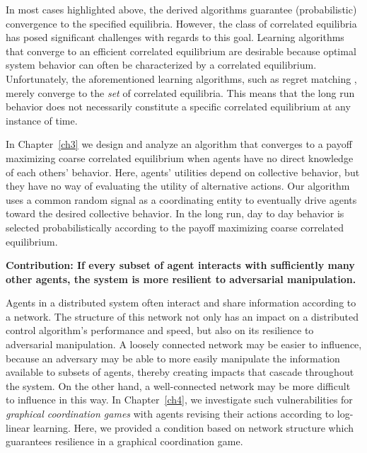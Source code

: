 In most cases highlighted above, the derived algorithms guarantee (probabilistic) convergence to the specified equilibria.  However, the class of correlated equilibria has posed significant challenges with regards to this goal. Learning algorithms that converge to an efficient correlated equilibrium are desirable because optimal system behavior can often be characterized by a correlated equilibrium. Unfortunately, the aforementioned learning algorithms, such as regret matching \cite{Hart2000}, merely converge to the {\it set} of correlated equilibria. This means that the long run behavior does not necessarily constitute a specific correlated equilibrium at any instance of time.


In Chapter~\ref{ch3} we design and analyze an algorithm that converges to a payoff maximizing coarse correlated equilibrium when agents have no direct knowledge of each others' behavior. Here, agents' utilities depend on collective behavior, but they have no way of evaluating the utility of alternative actions. Our algorithm uses a common random signal as a coordinating entity to eventually drive agents toward the desired collective behavior. In the long run, day to day behavior is selected probabilistically according to the payoff maximizing coarse correlated equilibrium.

 

\smallskip

 \noindent\textbf{Contribution: If every subset of agent interacts with sufficiently many other agents, the system is more resilient to adversarial manipulation.}


Agents in a distributed system often interact and share information according to a network. The structure of this network not only has an impact on a distributed control algorithm's performance and speed, but also on its resilience to adversarial manipulation. A loosely connected network may be easier to influence, because an adversary may be able to more easily manipulate the information available to subsets of agents, thereby creating impacts that cascade throughout the system. On the other hand, a well-connected network may be more difficult to influence in this way. In Chapter~\ref{ch4}, we investigate such vulnerabilities for  {\it graphical coordination games} \cite{Ullmann1977,Cooper1999} with agents revising their actions according to log-linear learning. Here, we provided a condition based on network structure which guarantees resilience in a graphical coordination game. 

